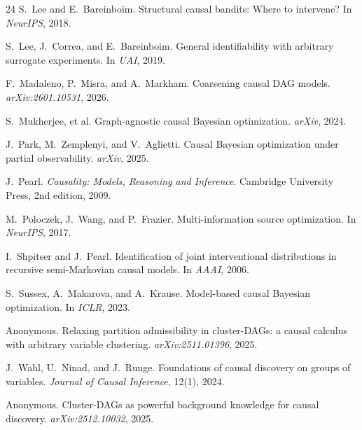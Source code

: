 \documentclass{article}
\begin{document}
\begin{thebibliography}{24}
S.~Lee and E.~Bareinboim.
\newblock Structural causal bandits: Where to intervene?
\newblock In \emph{NeurIPS}, 2018.

S.~Lee, J.~Correa, and E.~Bareinboim.
\newblock General identifiability with arbitrary surrogate experiments.
\newblock In \emph{UAI}, 2019.

F.~Madaleno, P.~Misra, and A.~Markham.
\newblock Coarsening causal {DAG} models.
\newblock \emph{arXiv:2601.10531}, 2026.

S.~Mukherjee, et al.
\newblock Graph-agnostic causal {B}ayesian optimization.
\newblock \emph{arXiv}, 2024.

J.~Park, M.~Zemplenyi, and V.~Aglietti.
\newblock Causal {B}ayesian optimization under partial observability.
\newblock \emph{arXiv}, 2025.

J.~Pearl.
\newblock \emph{Causality: Models, Reasoning and Inference}.
\newblock Cambridge University Press, 2nd edition, 2009.

M.~Poloczek, J.~Wang, and P.~Frazier.
\newblock Multi-information source optimization.
\newblock In \emph{NeurIPS}, 2017.

I.~Shpitser and J.~Pearl.
\newblock Identification of joint interventional distributions in
recursive semi-{M}arkovian causal models.
\newblock In \emph{AAAI}, 2006.

S.~Sussex, A.~Makarova, and A.~Krause.
\newblock Model-based causal {B}ayesian optimization.
\newblock In \emph{ICLR}, 2023.

Anonymous.
\newblock Relaxing partition admissibility in cluster-{DAG}s: a causal
calculus with arbitrary variable clustering.
\newblock \emph{arXiv:2511.01396}, 2025.

J.~Wahl, U.~Ninad, and J.~Runge.
\newblock Foundations of causal discovery on groups of variables.
\newblock \emph{Journal of Causal Inference}, 12(1), 2024.

Anonymous.
\newblock Cluster-{DAG}s as powerful background knowledge for causal
discovery.
\newblock \emph{arXiv:2512.10032}, 2025.


\end{thebibliography}
\end{document}
